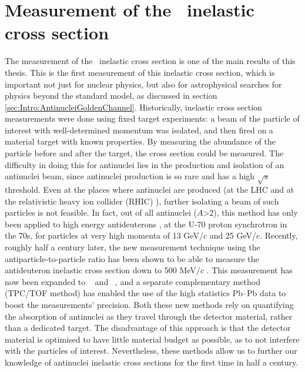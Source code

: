 







\section{Measurement of the \ahe\ inelastic cross section}\label{sec:ResHe3SigmaInel}
The measurement of the \ahe\ inelastic cross section is one of the main results of this thesis. This is the first measurement of this inelastic cross section, which is important not just for nuclear physics, but also for astrophysical searches for physics beyond the standard model, as discussed in section \ref{sec:Intro:AntinucleiGoldenChannel}. Historically, inelastic cross section measurements were done using fixed target experiments: a beam of the particle of interest with well-determined momentum was isolated, and then fired on a material target with known properties. By measuring the abundance of the particle before and after the target, the cross section could be measured. The difficulty in doing this for antinuclei lies in the production and isolation of an antinuclei beam, since antinuclei production is so rare and has a high $\sqrt{s}$ threshold. Even at the places where antinuclei are produced (at the LHC and at the relativistic heavy ion collider (RHIC) \cite{RHIC}), further isolating a beam of such particles is not feasible. In fact, out of all antinuclei ($A$>2), this method has only been applied to high energy antideuterons \cite{Binon:1970yu, Denisov:1971im}, at the U-70 proton synchrotron in the 70s, for particles at very high momenta of 13 GeV/$c$ and 25 GeV/$c$. Recently, roughly half a century later, the new measurement technique using the antiparticle-to-particle ratio has been shown to be able to measure the antideuteron inelastic cross section down to 500 MeV/$c$ \cite{antideuteronXS}. This measurement has now been expanded to \ahe\ \cite{antiHe3XS} and \atrit\ , and a separate complementary method (TPC/TOF method) has enabled the use of the high statistics Pb--Pb data to boost the measurements' precision. Both these new methods rely on quantifying the absorption of antinuclei as they travel through the detector material, rather than a dedicated target. The disadvantage of this approach is that the detector material is optimised to have little material budget as possible, as to not interfere with the particles of interest. Nevertheless, these methods allow us to further our knowledge of antinuclei inelastic cross sections for the first time in half a century.

